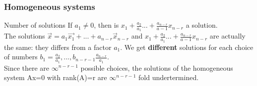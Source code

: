 \begin{frame}
	\frametitle{Homogeneous systems}
	\begin{block}{Number of solutions}
		If $a_1\neq0$, then is $x_1+\frac{a_2}{a_1}...+\frac{a_{n-r}}{a-1}x_{n-r}$ a solution.\\
		The solutions $\overrightarrow{x}=a_1\overrightarrow{x_1}+...+a_{n-r}\overrightarrow{x}_{n-r}$ and $x_1+\frac{a_2}{a_1}...+\frac{a_{n-r}}{a-1}x_{n-r}$ are actually the same: they differs from a factor $a_1$. 
		We get \textbf{different} solutions for each choice of numbers $b_1=\frac{a_2}{a_1},...,b_{n-r-1}\frac{a_{n-r}}{a_1}$. \\
		\vspace{4mm}
		Since there are $\infty^{n-r-1}$ possible choices, the solutions of the homogeneous system Ax=0 with rank(A)=r are $\infty^{n-r-1}$ fold undertermined.
	\end{block}
\end{frame}

